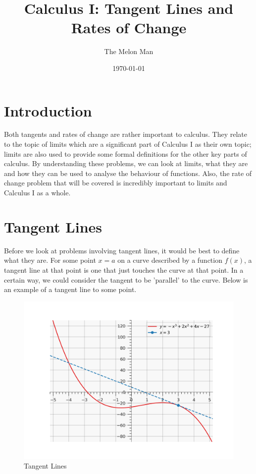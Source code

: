 \documentclass[12pt]{article}
\title{Calculus I: Tangent Lines and Rates of Change}
\author{The Melon Man}
\date{\today}
\theoremstyle{definition}
\begin{document}
\maketitle

\section{Introduction}
Both tangents and rates of change are rather important to calculus.
They relate to the topic of limits which are a significant part of Calculus I as their own topic; limits are also used to provide some formal definitions for the other key parts of calculus.
By understanding these problems, we can look at limits, what they are and how they can be used to analyse the behaviour of functions.
Also, the rate of change problem that will be covered is incredibly important to limits and Calculus I as a whole.

\section{Tangent Lines}
Before we look at problems involving tangent lines, it would be best to define what they are.
For some point $x=a$ on a curve described by a function $f(x)$, a tangent line at that point is one that just touches the curve at that point.
In a certain way, we could consider the tangent to be 'parallel' to the curve.
Below is an example of a tangent line to some point.

\begin{figure}[H]
    \centering
    \includegraphics[width=12.5cm, keepaspectratio]{tangent_lines_1.png}
    \caption{Tangent Lines}
    \label{fig:fig1}
\end{figure}
\end{document}

